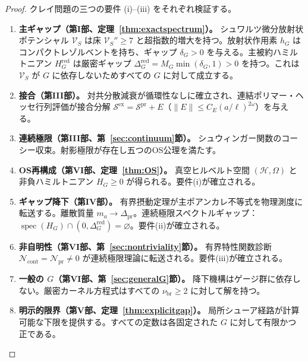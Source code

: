 \documentclass[12pt]{article}
\theoremstyle{plain}
\theoremstyle{definition}
\numberwithin{equation}{section}
\newcommand{\spec}{\operatorname{spec}}
\newcommand{\pr}{\mathrm{pr}}
\newcommand{\red}{\mathrm{red}}
\newcommand{\br}{\mathrm{br}}
\newcommand{\ex}{\mathrm{ex}}
\begin{document}
\begin{proof}
クレイ問題の三つの要件 (i)--(iii) をそれぞれ検証する。

\begin{enumerate}[label=\textbf{ステップ\arabic*.}]
\item \textbf{主ギャップ（第I部、定理~\ref{thm:exactspectrum}）。} シュワルツ微分放射状ポテンシャル $\mathcal{V}_S$ は床 $\mathcal{V}_S''\geq 7$ と超指数的増大を持つ。放射状作用素 $h_G$ はコンパクトレゾルベントを持ち、ギャップ $\delta_G>0$ を与える。主被約ハミルトニアン $H_G^{\red}$ は厳密ギャップ $\Delta_G^{\red}=M_G\min(\delta_G,1)>0$ を持つ。これは $\mathcal{V}_S$ が $G$ に依存しないためすべての $G$ に対して成立する。

\item \textbf{接合（第III部）。} 対共分散減衰が循環性なしに確立され、連結ポリマー・ヘッセ行列評価が接合分解 $\mathcal{S}^{\ex}=\mathcal{S}^{\pr}+E$（$\|E\|\leq C_E(a/\ell)^{2\omega}$）を与える。

\item \textbf{連続極限（第III部、第~\ref{sec:continuum}節）。} シュウィンガー関数のコーシー収束。射影極限が存在し五つのOS公理を満たす。

\item \textbf{OS再構成（第VI部、定理~\ref{thm:OS}）。} 真空ヒルベルト空間 $(\mathcal{H},\Omega)$ と非負ハミルトニアン $H_G\geq 0$ が得られる。要件(i)が確立される。

\item \textbf{ギャップ降下（第IV部）。} 有界摂動定理が主ポアンカレ不等式を物理測度に転送する。離散質量 $m_a\to\Delta_{\pr}$。連続極限スペクトルギャップ：$\spec(H_G)\cap(0,\Delta_G^{\red})=\varnothing$。要件(ii)が確立される。

\item \textbf{非自明性（第VI部、第~\ref{sec:nontriviality}節）。} 有界特性関数診断 $\mathcal{N}_{\mathrm{cont}}=\mathcal{N}_{\pr}\neq 0$ が連続極限理論に転送される。要件(iii)が確立される。

\item \textbf{一般の $G$（第VI部、第~\ref{sec:generalG}節）。} 降下機構はゲージ群に依存しない。厳密カーネル方程式はすべての $\nu_{\br}\geq 2$ に対して解を持つ。

\item \textbf{明示的限界（第V部、定理~\ref{thm:explicitgap}）。} 局所シューア経路が計算可能な下限を提供する。すべての定数は各固定された $G$ に対して有限かつ正である。\qedhere
\end{enumerate}
\end{proof}
\end{document}
